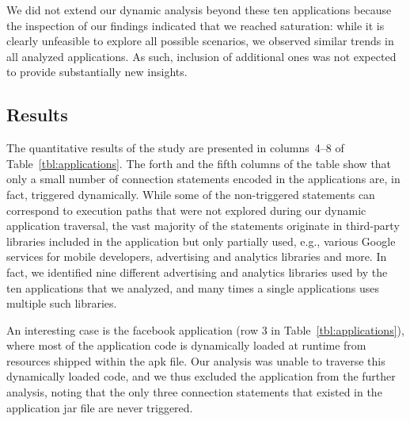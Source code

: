We did not extend our dynamic analysis beyond these ten applications because the inspection of our findings indicated that we reached saturation: while it is clearly unfeasible to explore all possible scenarios, we observed similar trends in all analyzed applications. As such, inclusion of additional ones was not expected to provide substantially new insights. 

\subsection{Results}
The quantitative results of the study are presented in columns~4--8 of Table~\ref{tbl:applications}. 
The forth and the fifth columns of the table show that only a small number of connection statements encoded in the applications are, in fact, triggered dynamically. 
While some of the non-triggered statements can correspond to execution paths that were not explored during our dynamic application traversal, the vast majority of the statements originate in  
third-party libraries included in the application but only partially used, e.g., various Google services for mobile developers, advertising and analytics libraries and more.
In fact, we identified nine different advertising and analytics libraries used by the ten applications that we analyzed, 
and many times a single applications uses multiple such libraries.

An interesting case is the facebook application (row 3 in Table~\ref{tbl:applications}), where most of the application code is dynamically loaded at runtime from resources shipped within the apk file. 
Our analysis was unable to traverse this dynamically loaded code, and we thus excluded the application from the further analysis, noting that the only three connection statements that existed in the application jar file are never triggered. 

\begin{table}[t]
\caption{Communication Types.}
\label{tbl:statementTypes}
\centering
\end{table}


